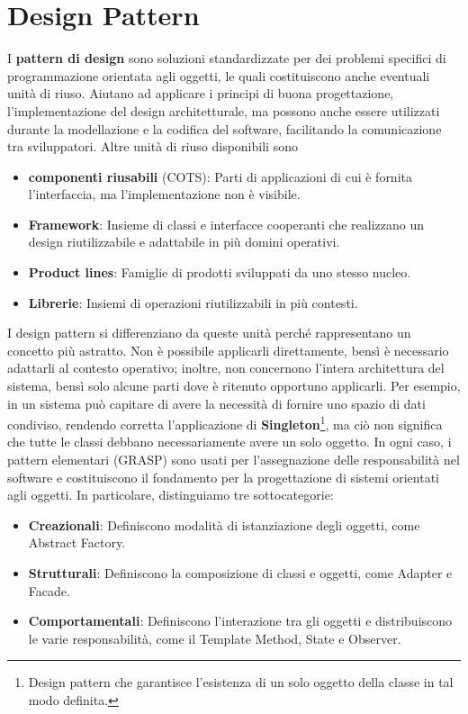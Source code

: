 %

\section{Design Pattern}
I \textbf{pattern di design} sono soluzioni standardizzate per dei problemi specifici di programmazione orientata agli oggetti, le quali costituiscono
anche eventuali unità di riuso. Aiutano ad applicare i principi di buona progettazione, l'implementazione del design architetturale, ma possono anche
essere utilizzati durante la modellazione e la codifica del software, facilitando la comunicazione tra sviluppatori. Altre unità di riuso disponibili
sono \begin{itemize}
	\item \textbf{componenti riusabili} (COTS): Parti di applicazioni di cui è fornita l'interfaccia, ma l'implementazione non è visibile.
	\item \textbf{Framework}: Insieme di classi e interfacce cooperanti che realizzano un design riutilizzabile e adattabile in più domini operativi.
	\item \textbf{Product lines}: Famiglie di prodotti sviluppati da uno stesso nucleo.
	\item \textbf{Librerie}: Insiemi di operazioni riutilizzabili in più contesti.
\end{itemize}

\noindent I design pattern si differenziano da queste unità perché rappresentano un concetto più astratto. Non è possibile applicarli direttamente,
bensì è necessario adattarli al contesto operativo; inoltre, non concernono l'intera architettura del sistema, bensì solo alcune parti dove è ritenuto
opportuno applicarli. Per esempio, in un sistema può capitare di avere la necessità di fornire uno spazio di dati condiviso, rendendo corretta
l'applicazione di \textbf{Singleton}\footnote{Design pattern che garantisce l'esistenza di un solo oggetto della classe in tal modo definita.}, ma ciò
non significa che tutte le classi debbano necessariamente avere un solo oggetto. In ogni caso, i pattern elementari (GRASP) sono usati per
l'assegnazione delle responsabilità nel software e costituiscono il fondamento per la progettazione di sistemi orientati agli oggetti. In particolare,
distinguiamo tre sottocategorie: \begin{itemize}
	\item \textbf{Creazionali}: Definiscono modalità di istanziazione degli oggetti, come Abstract Factory.
	\item \textbf{Strutturali}: Definiscono la composizione di classi e oggetti, come Adapter e Facade.
	\item \textbf{Comportamentali}: Definiscono l'interazione tra gli oggetti e distribuiscono le varie responsabilità, come il Template Method, State e
	Observer.
\end{itemize}

